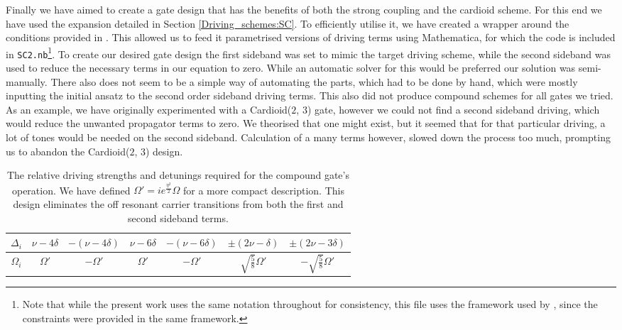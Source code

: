 \documentclass[12pt,twoside]{report}
\begin{document}
Finally we have aimed to create a gate design that has the benefits of both the strong coupling and the cardioid scheme. For this end we have used the expansion detailed in Section \ref{Driving_schemes:SC}. To efficiently utilise it, we have created a wrapper around the conditions provided in \cite{SC_github}. This allowed us to feed it parametrised versions of driving terms using Mathematica, for which the code is included in \texttt{SC2.nb}\footnote{Note that while the present work uses the same notation throughout for consistency, this file uses the framework used by \cite{SC_Paper}, since the constraints were provided in the same framework.}. To create our desired gate design the first sideband was set to mimic the target driving scheme, while the second sideband was used to reduce the necessary terms in our equation to zero. While an automatic solver for this would be preferred our solution was semi-manually. There also does not seem to be a simple way of automating the parts, which had to be done by hand, which were mostly inputting the initial ansatz to the second order sideband driving terms. This also did not produce compound schemes for all gates we tried. As an example, we have originally experimented with a Cardioid($2$, $3$) gate, however we could not find a second sideband driving, which would reduce the unwanted propagator terms to zero. We theorised that one might exist, but it seemed that for that particular driving, a lot of tones would be needed on the second sideband. Calculation of a many terms however, slowed down the process too much, prompting us to abandon the Cardioid($2$, $3$) design.

\begin{table}[t!]
	\centering
	\begin{tabular}{c||cccc|cc}
		\hline
		$\Delta_i$ & $\nu - 4\delta$ & $-(\nu - 4\delta)$ & $\nu - 6\delta$ & $-(\nu - 6\delta)$ & $\pm(2\nu - \delta)$ & $\pm(2\nu - 3\delta)$ \\
		\hline
		$\Omega_i$ & $\Omega'$ & $-\Omega'$ & $\Omega'$ & $-\Omega'$ & $\sqrt{\frac{5}{8}}\Omega'$ & $-\sqrt{\frac{5}{8}}\Omega'$\\
		\hline
	\end{tabular}
	\caption{The relative driving strengths and detunings required for the compound gate's operation. We have defined $\Omega' = ie^{\frac{\eta^2}{2}}\Omega$ for a more compact description. This design eliminates the off resonant carrier transitions from both the first and second sideband terms.}
	\label{tab:Compound}
\end{table}
\end{document}
